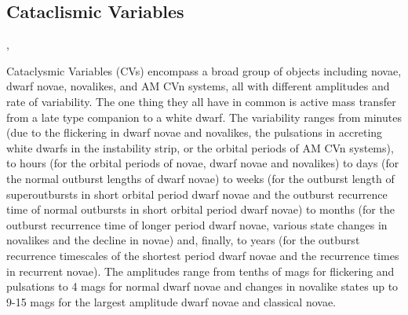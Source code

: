 %
%
%
%

\subsection{Cataclismic Variables}
\def\secname{\chpname:CVtransients}\label{sec:\secname}

,

Cataclysmic Variables (CVs) encompass a broad group of objects
including novae, dwarf novae, novalikes, and AM CVn systems, all with different
amplitudes and rate of variability. The one thing they all have in
common is active mass transfer from a late type companion to a
white dwarf. The variability ranges from minutes (due to the flickering in
dwarf novae and novalikes, the pulsations in accreting white dwarfs in
the instability strip, or the orbital periods of AM CVn systems), to
hours (for the orbital periods of novae, dwarf novae and novalikes) to
days (for the normal outburst lengths of dwarf novae) to
weeks (for the outburst length of superoutbursts in short orbital period
dwarf novae and the outburst recurrence time of normal outbursts in short
orbital period dwarf novae) to months (for the outburst recurrence time of
longer period dwarf novae, various state changes in novalikes and the decline
in novae) and, finally, to years (for the outburst recurrence timescales of the
shortest period dwarf novae and the recurrence times in recurrent novae). The
amplitudes range from tenths of mags for flickering and pulsations to 4 mags
for normal dwarf novae and changes in novalike states up to 9-15 mags for the
largest amplitude dwarf novae and classical novae.

